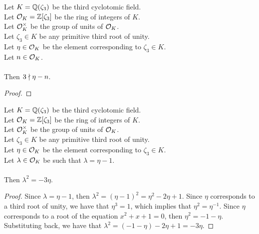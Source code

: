 \begin{theorem}
    \label{thm:not_exists_int_three_dvd_sub}
    \leanok
    Let $K = \mathbb{Q}(\zeta_3)$ be the third cyclotomic field. \\
    Let $\mathcal{O}_K = \mathbb{Z}[\zeta_3]$ be the ring of integers of $K$. \\
    Let $\mathcal{O}^\times_K$ be the group of units of $\mathcal{O}_K$. \\
    Let $\zeta_3 \in K$ be any primitive third root of unity. \\
    Let $\eta \in \mathcal{O}_K$ be the element corresponding to $\zeta_3 \in K$. \\
    Let $n \in \mathcal{O}_K$. \\\\
    Then $3 \nmid \eta - n$.
\end{theorem}
\begin{proof}
    \leanok
\end{proof}

\begin{lemma}
    \label{lmm:lambda_sq}
    \leanok
    Let $K = \mathbb{Q}(\zeta_3)$ be the third cyclotomic field. \\
    Let $\mathcal{O}_K = \mathbb{Z}[\zeta_3]$ be the ring of integers of $K$. \\
    Let $\mathcal{O}^\times_K$ be the group of units of $\mathcal{O}_K$. \\
    Let $\zeta_3 \in K$ be any primitive third root of unity. \\
    Let $\eta \in \mathcal{O}_K$ be the element corresponding to $\zeta_3 \in K$. \\
    Let $\lambda \in \mathcal{O}_K$ be such that $\lambda = \eta -1$. \\\\
    Then $\lambda^2 = -3 \eta$.
\end{lemma}
\begin{proof}
    \leanok
    Since $\lambda = \eta -1$, then $\lambda^2 = (\eta - 1)^2 = \eta^2 - 2\eta + 1$.
    Since $\eta$ corresponds to a third root of unity, we have that $\eta^3 = 1$,
    which implies that $\eta^2 = \eta^{-1}$.
    Since $\eta$ corresponds to a root of the equation $x^2 + x + 1 = 0$, then $\eta^2 = -1 - \eta$.
    Substituting back, we have that $\lambda^2 = (-1 - \eta) - 2\eta + 1 = -3\eta$.
\end{proof}

